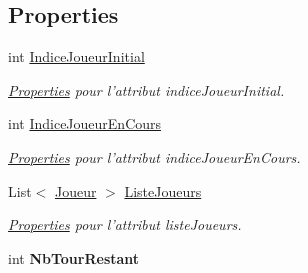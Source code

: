 \subsection*{Properties}
\begin{DoxyCompactItemize}
\item 
\hypertarget{class_small_world_1_1_partie_a90980cb948b814d74f05f97695e222f7}{int \hyperlink{class_small_world_1_1_partie_a90980cb948b814d74f05f97695e222f7}{Indice\-Joueur\-Initial}}\label{class_small_world_1_1_partie_a90980cb948b814d74f05f97695e222f7}

\begin{DoxyCompactList}\small\item\em \hyperlink{namespace_small_world_1_1_properties}{Properties} pour l'attribut indice\-Joueur\-Initial. \end{DoxyCompactList}\item 
\hypertarget{class_small_world_1_1_partie_ad122f7f50be9c63dc86670c0776c7207}{int \hyperlink{class_small_world_1_1_partie_ad122f7f50be9c63dc86670c0776c7207}{Indice\-Joueur\-En\-Cours}}\label{class_small_world_1_1_partie_ad122f7f50be9c63dc86670c0776c7207}

\begin{DoxyCompactList}\small\item\em \hyperlink{namespace_small_world_1_1_properties}{Properties} pour l'attribut indice\-Joueur\-En\-Cours. \end{DoxyCompactList}\item 
\hypertarget{class_small_world_1_1_partie_a314d85489e496738e12666ccef3f76c3}{List$<$ \hyperlink{class_small_world_1_1_joueur}{Joueur} $>$ \hyperlink{class_small_world_1_1_partie_a314d85489e496738e12666ccef3f76c3}{Liste\-Joueurs}}\label{class_small_world_1_1_partie_a314d85489e496738e12666ccef3f76c3}

\begin{DoxyCompactList}\small\item\em \hyperlink{namespace_small_world_1_1_properties}{Properties} pour l'attribut liste\-Joueurs. \end{DoxyCompactList}\item 
\hypertarget{class_small_world_1_1_partie_a6a04095981cc6a14b71971da8b37fabb}{int {\bfseries Nb\-Tour\-Restant}}\label{class_small_world_1_1_partie_a6a04095981cc6a14b71971da8b37fabb}


\end{DoxyCompactItemize}
